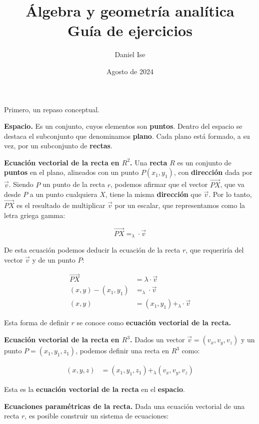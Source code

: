 \documentclass{article}
\title{Álgebra y geometría analítica\\Guía de ejercicios}
\author{Daniel Ise}
\date{Agosto de 2024}
\begin{document}
\maketitle

Primero, un repaso conceptual.

\textbf{Espacio.} Es un conjunto, cuyos elementos son \textbf{puntos}. Dentro 
del espacio se destaca el subconjunto que denominamos \textbf{plano}. Cada plano
está formado, a su vez, por un subconjunto de \textbf{rectas}.

\textbf{Ecuación vectorial de la recta en \(R^2\).} Una \textbf{recta} $R$ es un
conjunto de \textbf{puntos} en el plano, alineados con un punto $P (x_1, y_1)$,
con \textbf{dirección} dada por $\vec{v}$. Siendo $P$ un punto de la recta $r$,
podemos afirmar que el vector $\vec{PX}$, que va desde $P$ a un punto cualquiera
$X$, tiene la misma \textbf{dirección} que $\vec{v}$. Por lo tanto, \(\vec{PX}\)
es el resultado de multiplicar \(\vec{v}\) por un escalar, que representamos 
como la letra griega gamma:

\begin{equation*}
    \vec{PX} = _\lambda \cdot \vec{v}
\end{equation*}

De esta ecuación podemos deducir la ecuación de la recta $r$, que requeriría del
vector \(\vec{v}\) y de un punto $P$:

\begin{align*}
    \vec{PX} & = \lambda \cdot \vec{v}\\
    (x,y) - (x_1,y_1) & = _\lambda \cdot \vec{v}\\
    (x,y) & = (x_1,y_1) + _\lambda \cdot \vec{v}
\end{align*}

Esta forma de definir $r$ se conoce como 
\textbf{ecuación vectorial de la recta.}

\textbf{Ecuación vectorial de la recta en \(R^3\).} Dados un vector 
\(\vec{v} = (v_x,v_y,v_z)\) y un punto \(P = (x_1, y_1, z_1)\), podemos definir
una recta en \(R^3\) como:

\begin{align*}
    (x, y, z) & = (x_1,y_1,z_1) + _\lambda (v_x, v_y, v_z)
\end{align*}

Esta es la \textbf{ecuación vectorial de la recta} en el \textbf{espacio}.

\textbf{Ecuaciones paramétricas de la recta.} Dada una ecuación vectorial de una 
recta \(r\), es posible construir un sistema de ecuaciones:
\end{document}
